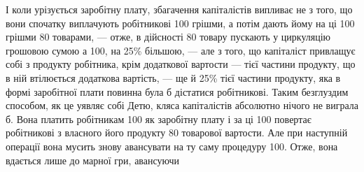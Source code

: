 І коли урізується заробітну плату, збагачення капіталістів випливає
не з того, що вони спочатку виплачують робітникові 100
грішми, а потім дають йому на ці 100 грішми 80
товарами, — отже, в дійсності 80 товару пускають у циркуляцію
грошовою сумою а 100, на 25\% більшою, — але з того, що капіталіст
привлащує собі з продукту робітника, крім додаткової вартости — тієї
частини продукту, що в ній втілюється додаткова вартість, — ще й
25\% тієї частини продукту, яка в формі заробітної плати повинна була
б дістатися робітникові. Таким безглуздим способом, як це уявляє собі Детю,
кляса капіталістів абсолютно нічого не виграла б. Вона платить робітникам
100 як заробітну плату і за ці 100 повертає робітникові
з власного його продукту 80 товарової вартости. Але
при наступній операції вона мусить знову авансувати на ту саму процедуру
100. Отже, вона вдається лише до марної гри, авансуючи
\parbreak{}  %
